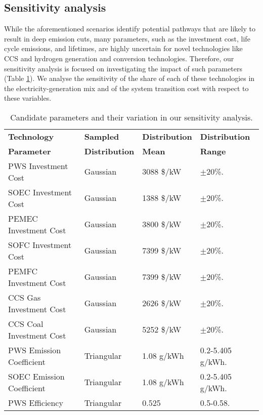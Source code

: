 \subsection{Sensitivity analysis}
While the aforementioned scenarios identify potential pathways that are likely to result in deep emission cuts, many parameters, such as the investment cost, life cycle emissions, and lifetimes, are highly uncertain for novel technologies like \gls{CCS} and hydrogen generation and conversion technologies. Therefore, our sensitivity analysis is focused on investigating the impact of such parameters (Table \ref{sa-vars}). We analyse the sensitivity of the share of each of these technologies in the electricity-generation mix and of the system transition cost with respect to these variables.

\begin{table}[H]
\centering
	\caption{Candidate parameters and their variation in our sensitivity analysis.}
	\vspace{0.1in}
	\begin{tabularx}{0.9\textwidth}{p{} p{} p{}p{}}
\hline 
\textbf{Technology}  & \textbf{Sampled} & \textbf{Distribution}& \textbf{Distribution}\\
\textbf{Parameter} & \textbf{Distribution} & \textbf{Mean}& \textbf{Range}\\
\hline
\gls{PWS} Investment Cost       & Gaussian    & 3088 \$/kW & $\pm$20\%. \\                  
\gls{SOEC} Investment Cost      & Gaussian    & 1388 \$/kW & $\pm$20\%.\\                  
\gls{PEMEC} Investment Cost     & Gaussian    & 3800 \$/kW & $\pm$20\%.\\                  
\gls{SOFC} Investment Cost      & Gaussian    & 7399 \$/kW & $\pm$20\%.\\                  
\gls{PEMFC} Investment Cost     & Gaussian    & 7399 \$/kW & $\pm$20\%.\\                  
\gls{CCS} Gas Investment Cost   & Gaussian    & 2626 \$/kW & $\pm$20\%.\\                  
\gls{CCS} Coal Investment Cost  & Gaussian    & 5252 \$/kW & $\pm$20\%.\\
\gls{PWS} Emission Coefficient  & Triangular  & 1.08 g/kWh & 0.2-5.405 g/kWh. \\                  
\gls{SOEC} Emission Coefficient & Triangular  & 1.08 g/kWh & 0.2-5.405 g/kWh. \\
\gls{PWS} Efficiency            & Triangular  & 0.525 & 0.5-0.58. \\                               
\hline
	\end{tabularx}
\label{sa-vars}
\end{table}

